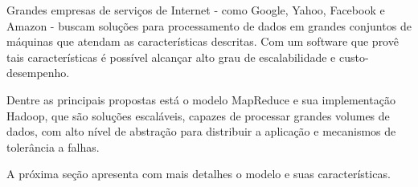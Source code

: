 Grandes empresas de serviços de Internet - como Google, Yahoo, Facebook e Amazon - buscam soluções para processamento de dados em grandes conjuntos de máquinas que atendam as características descritas. Com um software que provê tais características é possível alcançar alto grau de escalabilidade e custo-desempenho. 

Dentre as principais propostas está o modelo MapReduce e sua implementação Hadoop, que são soluções escaláveis, capazes de processar grandes volumes de dados, com alto nível de abstração para distribuir a aplicação e mecanismos de tolerância a falhas.

A próxima seção apresenta com mais detalhes o modelo e suas características.

%
%
%
%
%
%
%
%
